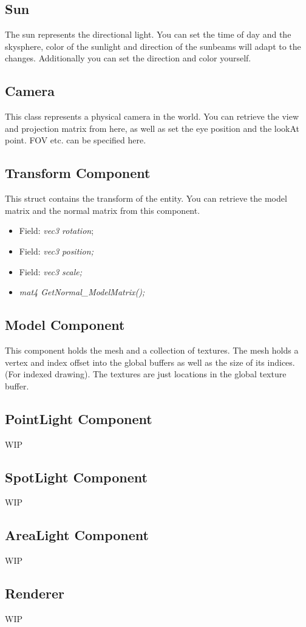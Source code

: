 \documentclass{article}
\begin{document}
\subsection{Sun}
The sun represents the directional light.
You can set the time of day and the skysphere, color of the sunlight and direction of the sunbeams will adapt to the changes.
Additionally you can set the direction and color yourself. 

\subsection{Camera}
This class represents a physical camera in the world. 
You can retrieve the view and projection matrix from here, as well as set the eye position and the lookAt point. 
FOV etc. can be specified here. 

\subsection{Transform Component}
This struct contains the transform of the entity. 
You can retrieve the model matrix and the normal matrix from this component. 
\begin{tcolorbox}[colback=blue!5!white,colframe=blue!75!black,title=Scene Interface]
    \begin{itemize}
        \item Field: \textit{vec3 rotation};
        \item Field: \textit{vec3 position;}
        \item Field: \textit{vec3 scale;}
        \item \textit{mat4 GetNormal\_ModelMatrix();}
    \end{itemize}    
\end{tcolorbox}

\subsection{Model Component}
This component holds the mesh and a collection of textures. 
The mesh holds a vertex and index offset into the global buffers as well as the size of its indices. (For indexed drawing). 
The textures are just locations in the global texture buffer.



\subsection{PointLight Component}
WIP

\subsection{SpotLight Component}
WIP

\subsection{AreaLight Component}
WIP

\subsection{Renderer}
WIP
\end{document}
